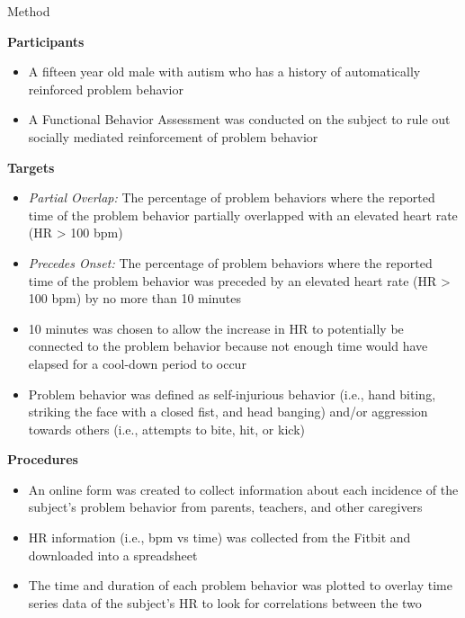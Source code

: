 \documentclass[final]{beamer}
\newlength{\onecolwid}
\begin{document}
\begin{frame}[t]
\begin{columns}[t]
\begin{column}{\onecolwid}
\begin{alertblock}{Method}
	\begin{center}
		\textbf{Participants}
	\end{center}
	\begin{itemize}
		\item A fifteen year old male with autism who has a history of automatically reinforced problem behavior
		\item A Functional Behavior Assessment was conducted on the subject to rule out socially mediated reinforcement of problem behavior
	\end{itemize}

	\begin{center}
		\textbf{Targets}
	\end{center}
	\begin{itemize}
		\item \textit{Partial Overlap:} The percentage of problem behaviors where the reported time of the problem behavior partially overlapped with an elevated heart rate (HR > 100 bpm)
		\item \textit{Precedes Onset:} The percentage of problem behaviors where the reported time of the problem behavior was preceded by an elevated heart rate (HR > 100 bpm) by no more than 10 minutes
		\item 10 minutes was chosen to allow the increase in HR to potentially be connected to the problem behavior because not enough time would have elapsed for a cool-down period to occur
		\item Problem behavior was defined as self-injurious behavior (i.e., hand biting, striking the face with a closed fist, and head banging) and/or aggression towards others (i.e., attempts to bite, hit, or kick)
	\end{itemize}

	\begin{center}
		\textbf{Procedures}
	\end{center}
	\begin{itemize}
		\item An online form was created to collect information about each incidence of the subject's problem behavior from parents, teachers, and other caregivers
		\item HR information (i.e., bpm vs time) was collected from the Fitbit and downloaded into a spreadsheet
		\item The time and duration of each problem behavior was plotted to overlay time series data of the subject's HR to look for correlations between the two
	\end{itemize}


\end{alertblock}
\end{column}
\end{columns}
\end{frame}
\end{document}
